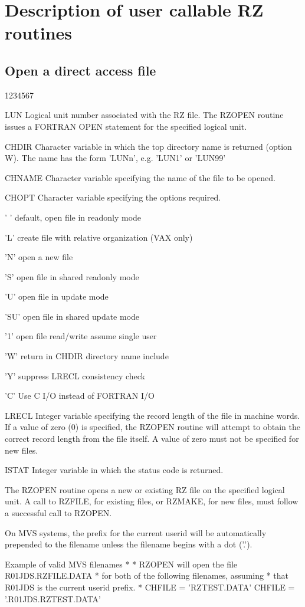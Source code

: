 \chapter{Description of user callable RZ routines}
\section{Open a direct access file}
\Idesc
\begin{DLtt}{1234567}
\item[LUN]Logical unit number associated with the RZ file.
The RZOPEN routine issues a FORTRAN OPEN statement for the
specified logical unit.
\item[CHDIR]Character variable in which the top directory
name is returned (option W). The name has the form
'LUNn', e.g. 'LUN1' or 'LUN99'
\item[CHNAME]Character variable specifying the name of the 
file to be opened.
\item[CHOPT]Character variable specifying the options required.
\begin{DLtt}{12}
\item[' ']  default, open file in readonly mode
\item['L']  create file with relative organization (VAX only)
\item['N']  open a new file
\item['S']  open file in shared readonly mode
\item['U']  open file in update mode
\item['SU'] open file in shared update mode
\item['1']  open file read/write assume single user
\item['W']  return in CHDIR directory name include
\item['Y']  suppress LRECL consistency check
\item['C']  Use C I/O instead of FORTRAN I/O
\end{DLtt}
\item[LRECL]Integer variable specifying the record length
of the file in machine words.
If a value of zero (0) is specified, the RZOPEN routine 
will attempt to obtain the correct record length from
the file itself. A value of zero must not be specified for new files.
\item[ISTAT]Integer variable in which the status code
is returned. 
\end{DLtt}
\par
The RZOPEN routine opens a new or existing RZ file
on the specified logical unit. A call to RZFILE, for
existing files, or RZMAKE, for new files, must follow
a successful call to RZOPEN.
\par
On MVS systems, the prefix for the current userid
will be automatically prepended to the filename
unless the filename begins with a dot ('.').
\begin{XMPt}{Example of valid MVS filenames}
*
*     RZOPEN will open the file R01JDS.RZFILE.DATA
*     for both of the following filenames, assuming
*     that R01JDS is the current userid prefix.
*
      CHFILE = 'RZTEST.DATA'
      CHFILE = '.R01JDS.RZTEST.DATA'
\end{XMPt}
